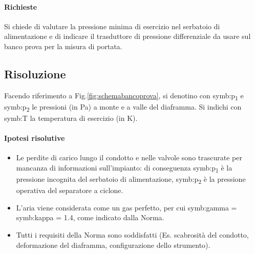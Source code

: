 \paragraph{Richieste}
Si chiede di valutare la pressione minima di esercizio nel serbatoio di alimentazione e di indicare il trasduttore di pressione differenziale da usare sul banco prova per la misura di portata.


\subsection{Risoluzione}
Facendo riferimento a Fig.\ref{fig:schemabancoprova}, si denotino con \gls{symb:p}\textsubscript{1} e \gls{symb:p}\textsubscript{2} le pressioni (in Pa) a monte e a valle del diaframma. Si indichi con \gls{symb:T} la temperatura di esercizio (in K).

\paragraph{Ipotesi risolutive}
\begin{itemize}
	\item Le perdite di carico lungo il condotto e nelle valvole sono trascurate per mancanza di informazioni sull'impianto: di conseguenza \gls{symb:p}\textsubscript{1} è la pressione incognita del serbatoio di alimentazione, \gls{symb:p}\textsubscript{2} è la pressione operativa del separatore a ciclone.
	\item L'aria viene considerata come un gas perfetto, per cui \gls{symb:gamma} = \gls{symb:kappa} = 1.4, come indicato dalla Norma.
	\item Tutti i requisiti della Norma sono soddisfatti (Es. scabrosità del condotto, deformazione del diaframma, configurazione dello strumento).
	\end{itemize}

